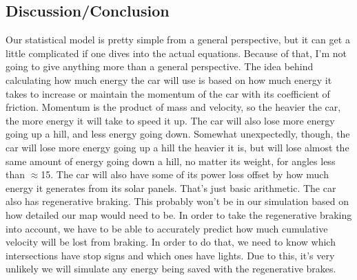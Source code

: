 \documentclass[onecolumn, draftclsnofoot,10pt, compsoc]{IEEEtran}
\begin{document}
\begin{singlespace}
\subsection{Discussion/Conclusion}
Our statistical model is pretty simple from a general perspective, but it can get a little complicated if one dives into the actual equations.
Because of that, I'm not going to give anything more than a general perspective.
The idea behind calculating how much energy the car will use is based on how much energy it takes to increase or maintain the momentum of the car with its coefficient of friction.
Momentum is the product of mass and velocity, so the heavier the car, the more energy it will take to speed it up.
The car will also lose more energy going up a hill, and less energy going down.
Somewhat unexpectedly, though, the car will lose more energy going up a hill the heavier it is, but will lose almost the same amount of energy going down a hill, no matter its weight, for angles less than $\approx$15\degree.
The car will also have some of its power loss offset by how much energy it generates from its solar panels.
That's just basic arithmetic.
The car also has regenerative braking.
This probably won't be in our simulation based on how detailed our map would need to be.
In order to take the regenerative braking into account, we have to be able to accurately predict how much cumulative velocity will be lost from braking.
In order to do that, we need to know which intersections have stop signs and which ones have lights.
Due to this, it's very unlikely we will simulate any energy being saved with the regenerative brakes.




    \end{singlespace}
\end{document}
